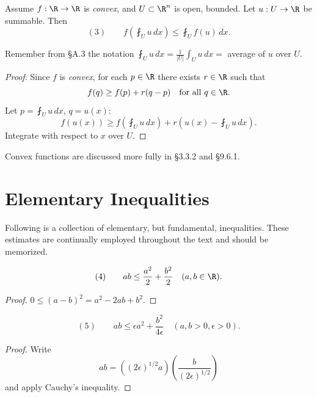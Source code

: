 \begin{theorem}
\label{thm:jensens-inequality}
Assume $f: \R \to \R$ is \textit{convex}, and $U \subset \R^n$ is open, bounded. Let $u: U \to \R$ be summable. Then
$$(3) \qquad f\left(\fint_U u\,dx\right) \leq \fint_U f(u)\,dx.$$

Remember from \S A.3 the notation $\fint_U u\,dx = \frac{1}{|U|} \int_U u\,dx = $ average of $u$ over $U$.
\end{theorem}

\begin{proof}
Since $f$ is \textit{convex}, for each $p \in \R$ there exists $r \in \R$ such that
$$f(q) \geq f(p) + r(q - p) \quad \text{for all } q \in \R.$$
Let $p = \fint_U u\,dx$, $q = u(x)$:
$$f(u(x)) \geq f\left(\fint_U u\,dx\right) + r\left(u(x) - \fint_U u\,dx\right).$$
Integrate with respect to $x$ over $U$.
\end{proof}

Convex functions are discussed more fully in \S 3.3.2 and \S 9.6.1.

\section{Elementary Inequalities}
\label{sec:elementary-inequalities}

Following is a collection of elementary, but fundamental, inequalities. These estimates are continually employed throughout the text and should be memorized.

\begin{lemma}
\label{lem:cauchys-inequality}
$$(4) \qquad ab \leq \frac{a^2}{2} + \frac{b^2}{2} \quad (a,b \in \R).$$
\end{lemma}

\begin{proof}
$0 \leq (a-b)^2 = a^2 - 2ab + b^2$.
\end{proof}

\begin{lemma}
\label{lem:cauchys-inequality-epsilon}
$$(5) \qquad ab \leq \epsilon a^2 + \frac{b^2}{4\epsilon} \quad (a,b > 0, \epsilon > 0).$$
\end{lemma}

\begin{proof}
Write
$$ab = ((2\epsilon)^{1/2}a)\left(\frac{b}{(2\epsilon)^{1/2}}\right)$$
and apply Cauchy's inequality.
\end{proof}

